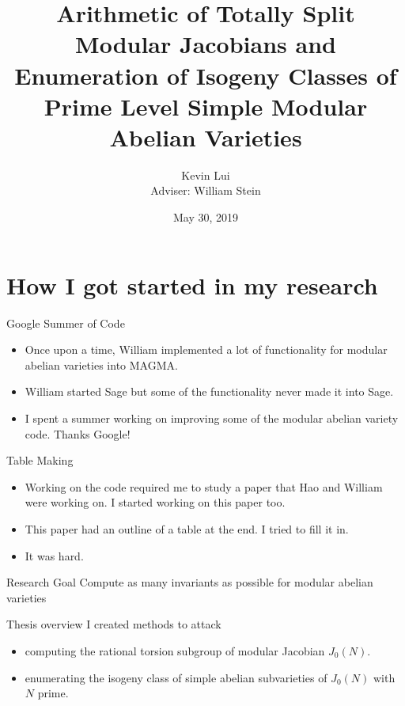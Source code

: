\documentclass{beamer}
\title{%
    Arithmetic of Totally Split Modular Jacobians and Enumeration of Isogeny
    Classes of Prime Level Simple Modular Abelian Varieties
}
\author{Kevin Lui\\Adviser: William Stein}
\date{May 30, 2019}
\institute{Final Exam}
\begin{document}
\frame{\titlepage}

\section{How I got started in my research}

\begin{frame}{Google Summer of Code}
    \begin{itemize}
        \item 
            Once upon a time, William implemented a lot of functionality
            for modular abelian varieties into MAGMA.
        \item
            William started Sage but some of the functionality never made it
            into Sage.
        \item
            I spent a summer working on improving some of the modular abelian
            variety code. Thanks Google!
    \end{itemize} 
\end{frame}

\begin{frame}{Table Making}
    \begin{itemize}
        \item
            Working on the code required me to study a paper that Hao and
            William were working on. I started working on this paper too.
        \item
            This paper had an outline of a table at the end. I tried to fill it
            in.
        \item
            It was hard.
   \end{itemize} 
\end{frame}

\begin{frame}{Research Goal}
    \Huge{Compute as many invariants as possible for modular abelian
    varieties}
\end{frame}

\begin{frame}{Thesis overview}
    I created methods to attack
    \begin{itemize}
        \item
            computing the rational torsion subgroup of modular
            Jacobian $J_0(N)$.
        \item
            enumerating the isogeny class of simple abelian subvarieties of
            $J_0(N)$ with $N$ prime.
    \end{itemize}
\end{frame}
\end{document}

